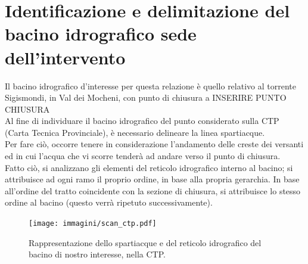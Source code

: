 \section{Identificazione e delimitazione del bacino idrografico sede dell'intervento}
Il bacino idrografico d'interesse per questa relazione è quello relativo al torrente Sigismondi, in Val dei Mocheni, con punto di chiusura a INSERIRE PUNTO CHIUSURA\\
Al fine di individuare il bacino idrografico del punto considerato sulla CTP (Carta Tecnica Provinciale), è necessario delineare la linea spartiacque.\\
Per fare ciò, occorre tenere in considerazione l'andamento delle creste dei versanti ed in cui l'acqua che vi scorre tenderà ad andare verso il punto di chiusura.\\
Fatto ciò, si analizzano gli elementi del reticolo idrografico interno al bacino; si attribuisce ad ogni ramo il proprio ordine, in base alla propria gerarchia. In base all'ordine del tratto coincidente con la sezione di chiusura, si attribuisce lo stesso ordine al bacino (questo verrà ripetuto successivamente).
\begin{figure}[H]\centering
    \texttt{[image: immagini/scan\_ctp.pdf]}
    \caption{Rappresentazione dello spartiacque e del reticolo idrografico del bacino di nostro interesse, nella CTP.}
  \label{scan_ctp}
\end{figure}

